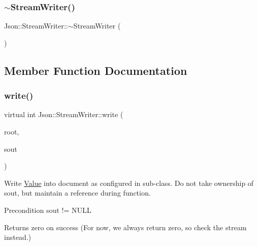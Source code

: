 \mbox{\label{classJson_1_1StreamWriter_a03f8fb6a873b6b50f05bc4556e043c3a_a03f8fb6a873b6b50f05bc4556e043c3a}} 
\subsubsection{\texorpdfstring{$\sim$\+Stream\+Writer()}{~StreamWriter()}}
{\footnotesize\ttfamily Json\+::\+Stream\+Writer\+::$\sim$\+Stream\+Writer (\begin{DoxyParamCaption}{ }\end{DoxyParamCaption})\hspace{0.3cm}{\ttfamily [virtual]}}



\subsection{Member Function Documentation}
\mbox{\label{classJson_1_1StreamWriter_a84278bad0c9a9fc587bc2a97c5bb5993_a84278bad0c9a9fc587bc2a97c5bb5993}} 
\subsubsection{\texorpdfstring{write()}{write()}}
{\footnotesize\ttfamily virtual int Json\+::\+Stream\+Writer\+::write (\begin{DoxyParamCaption}\item[{\hyperlink{classJson_1_1Value}{Value} const \&}]{root,  }\item[{\hyperlink{json_8h_a37a25be5fca174927780caeb280094ce_a37a25be5fca174927780caeb280094ce}{J\+S\+O\+N\+C\+P\+P\+\_\+\+O\+S\+T\+R\+E\+AM} $\ast$}]{sout }\end{DoxyParamCaption})\hspace{0.3cm}{\ttfamily [pure virtual]}}

Write \hyperlink{classJson_1_1Value}{Value} into document as configured in sub-\/class. Do not take ownership of sout, but maintain a reference during function. \begin{DoxyPrecond}{Precondition}
sout != N\+U\+LL 
\end{DoxyPrecond}
\begin{DoxyReturn}{Returns}
zero on success (For now, we always return zero, so check the stream instead.) 
\end{DoxyReturn}

